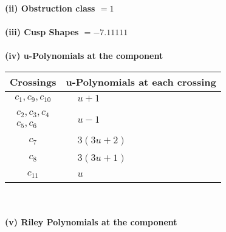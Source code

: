 \documentclass[1p]{elsarticle_modified}
\theoremstyle{definition}
\begin{document}
\flushleft \textbf{(ii) Obstruction class $= 1$}\\~\\
\flushleft \textbf{(iii) Cusp Shapes $= -7.11111$}\\~\\
\newpage\renewcommand{\arraystretch}{1}
\flushleft \textbf{(iv) u-Polynomials at the component}\newline \\
\begin{tabular}{m{50pt}|m{274pt}}
Crossings & \hspace{64pt}u-Polynomials at each crossing \\
\hline $$\begin{aligned}c_{1},c_{9},c_{10}\end{aligned}$$&$\begin{aligned}
&u+1
\end{aligned}$\\
\hline $$\begin{aligned}c_{2},c_{3},c_{4}\\c_{5},c_{6}\end{aligned}$$&$\begin{aligned}
&u-1
\end{aligned}$\\
\hline $$\begin{aligned}c_{7}\end{aligned}$$&$\begin{aligned}
&3(3 u+2)
\end{aligned}$\\
\hline $$\begin{aligned}c_{8}\end{aligned}$$&$\begin{aligned}
&3(3 u+1)
\end{aligned}$\\
\hline $$\begin{aligned}c_{11}\end{aligned}$$&$\begin{aligned}
&u
\end{aligned}$\\
\hline
\end{tabular}\\~\\
\newpage\renewcommand{\arraystretch}{1}
\flushleft \textbf{(v) Riley Polynomials at the component}\newline \\
\end{document}
